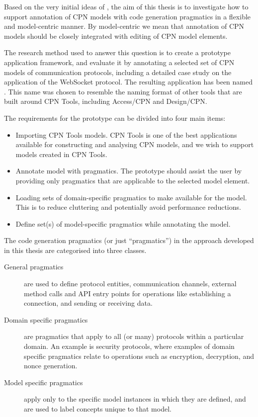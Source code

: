 Based on the very initial ideas of \cite{Simonsen2011}, the aim of this thesis
is to investigate how to support annotation of CPN models with code generation
pragmatics in a flexible and model-centric manner. By model-centric we mean that
annotation of CPN models should be closely integrated with editing of CPN model
elements.

The research method used to answer this question is to create a prototype
application framework, and evaluate it by annotating a selected set of CPN
models of communication protocols, including a detailed case study on the
application of the WebSocket protocol. The resulting application has been named
\thename{}. This name was chosen to resemble the naming format of other tools that
are built around CPN Tools, including Access/CPN and Design/CPN.

The requirements for the prototype can be divided into four main items:

\begin{itemize} 
	\item Importing CPN Tools models. CPN Tools is one of the best applications
	available for constructing and analysing CPN models, and we wish to
	support models created in CPN Tools.

	\item Annotate model with pragmatics. The prototype should assist the user by
	providing only pragmatics that are applicable to the selected model element.
		
	\item Loading sets of domain-specific pragmatics to make available for the
	model. This is to reduce cluttering and potentially avoid performance
	reductions.
	
	\item Define set(s) of model-specific pragmatics while annotating the model. 

\end{itemize}

The code generation pragmatics (or just ``pragmatics'') in the approach
developed in this thesis are categorised into three classes.
\begin{description}
	\item[General pragmatics] are used to define protocol entities, communication
	channels, external method calls and API entry points for operations like
	establishing a connection, and sending or receiving data.
	\item[Domain specific pragmatics] are pragmatics that apply to all (or many)
	protocols within a particular domain. An example is security protocols, where
	examples of domain specific pragmatics relate to operations such as
	encryption, decryption, and nonce generation.
	\item[Model specific pragmatics] apply only to the specific model instances in
	which they are defined, and are used to label concepts unique to that model. 
\end{description}

